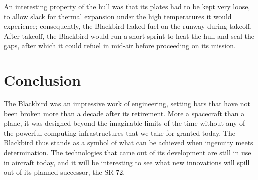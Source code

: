 \documentclass[12pt, draftclsnofoot, onecolumn]{IEEEtran}
\begin{document}
		An interesting property of the hull was that its plates had to be kept very loose, to allow slack for thermal expansion under the high temperatures it would experience; consequently, the Blackbird leaked fuel on the runway during takeoff. After takeoff, the Blackbird would run a short sprint to heat the hull and seal the gaps, after which it could refuel in mid-air before proceeding on its mission.

\section{Conclusion}

	The Blackbird was an impressive work of engineering, setting bars that have not been broken more than a decade after its retirement. More a spacecraft than a plane, it was designed beyond the imaginable limits of the time without any of the powerful computing infrastructures that we take for granted today. The Blackbird thus stands as a symbol of what can be achieved when ingenuity meets determination. The technologies that came out of its development are still in use in aircraft today, and it will be interesting to see what new innovations will spill out of its planned successor, the SR-72.

{}

\end{document}
